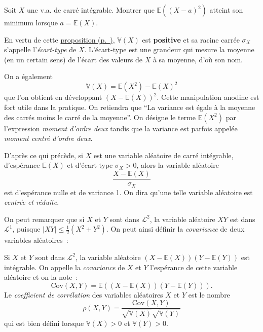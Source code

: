 \label{II-exo-approx}
Soit \(X\) une v.a. de carré intégrable. Montrer que
\(\mathbb{E}((X - a)^2 )\) atteint son minimum lorsque
\(a = \mathbb{E}(X)\).

\begin{remarque}\label{II-la-variance-est-positive}

En vertu de cette
\protect\hyperref[II-propl2]{proposition (p.~\pageref*{II-propl2})},
\(\mathbb{V}(X)\) est \textbf{positive} et sa racine carrée \(\sigma_X\)
s'appelle l'\emph{écart-type} de \(X\). L'écart-type est une grandeur
qui mesure la moyenne (en un certain sens) de l'écart des valeurs de
\(X\) à sa moyenne, d'où son nom.

On a également \[\mathbb{V}(X) = \mathbb{E}(X^2)-\mathbb{E}(X)^2\] que
l'on obtient en développant \((X-\mathbb{E}(X))^2\). Cette manipulation
anodine est fort utile dans la pratique. On retiendra que ``La variance
est égale à la moyenne des carrés moins le carré de la moyenne''. On
désigne le terme \(\mathbb{E}(X^2)\) par l'expression \emph{moment
d'ordre deux} tandis que la variance est parfois appelée \emph{moment
centré d'ordre deux}.
\end{remarque}

\begin{remarque}\label{II-variable-centruxe9e-ruxe9duite}

D'après ce qui précède, si \(X\) est une variable aléatoire de carré
intégrable, d'espérance \(\mathbb{E}(X)\) et d'écart-type
\(\sigma_X >0\), alors la variable aléatoire
\[\frac{X-\mathbb{E}(X)}{\sigma_X}\] est d'espérance nulle et de
variance 1. On dira qu'une telle variable aléatoire est \emph{centrée et
réduite}.

On peut remarquer que si \(X\) et \(Y\) sont dans \(\mathcal{L}^2\), la
variable aléatoire \(XY\) est dans \(\mathcal{L}^1\), puisque
\(|XY| \leq \frac{1}{2}(X^2+Y^2)\). On peut ainsi définir la
\emph{covariance} de deux variables aléatoires~:
\end{remarque}

\begin{definition}[{Covariance}]\label{II-defcov}

Si \(X\) et \(Y\) sont dans \(\mathcal{L}^2\), la variable aléatoire
\((X-\mathbb{E}(X))(Y-\mathbb{E}(Y))\) est intégrable. On appelle la
\emph{covariance} de \(X\) et \(Y\) l'espérance de cette variable
aléatoire et on la note~:
\[\text{Cov}(X,Y) = \mathbb{E}((X-\mathbb{E}(X))(Y-\mathbb{E}(Y))).\] Le
\emph{coefficient de corrélation} des variables aléatoires \(X\) et
\(Y\) est le nombre
\[\rho(X,Y) = \frac{\text{Cov}(X,Y)}{\sqrt{\mathbb{V}(X)}\sqrt{\mathbb{V}(Y)}}\]
qui est bien défini lorsque \(\mathbb{V}(X)>0\) et \(\mathbb{V}(Y)>0\).
\end{definition}

